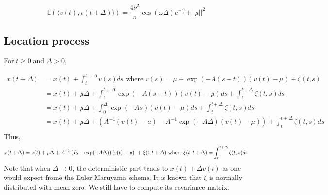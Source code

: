 \documentclass[11pt]{article}
\newcommand {\1}{\mathbb{1}}
\begin{document}
\begin{equation}
	\mathbb{E}(\langle v(t), v(t+\Delta) \rangle )=\frac{4\nu^2}{\pi} \cos(\omega \Delta) e^{-\frac{\Delta}{\tau}}+\vert \vert \mu \vert \vert^2
	\label{eq: RACVM autocovariance function}
\end{equation}

\subsection{Location process} \label{RACVM location process}
For $t \geq 0$ and $\Delta >0$,

\begin{align*}
	x(t+\Delta)&=x(t)+\int_t^{t+\Delta} v(s) ds \mbox{ where } v(s)=\mu+\exp(-A(s-t))(v(t)-\mu)+\zeta(t,s) \\
	&= x(t)+\mu \Delta+\int_t^{t+\Delta} \exp(-A(s-t))(v(t)-\mu) ds +\int_t^{t+\Delta} \zeta(t,s) ds \\
	&= x(t)+\mu \Delta +\int_0^{\Delta} \exp(-As)(v(t)-\mu) ds +\int_t^{t+\Delta} \zeta(t,s) ds \\
	&=x(t)+\mu \Delta + (A^{-1}(v(t)-\mu)-A^{-1}\exp(-A\Delta)(v(t)-\mu))+\int_t^{t+\Delta} \zeta(t,s) ds \\
\end{align*}
Thus, 
\begin{equation}
	x(t+\Delta)=x(t)+\mu \Delta+A^{-1} \left( I_2-\exp(-A\Delta)\right)(v(t)-\mu) +\xi(t,t+\Delta) \\
	\mbox{ where } \xi(t,t+\Delta)=\int_t^{t+\Delta} \zeta(t,s)ds
\end{equation}
Note that when $\Delta \rightarrow 0$, the deterministic part tends to $x(t)+\Delta v(t)$ as one would expect frome the Euler Maruyama scheme.
It is known that $\xi$ is normally distributed with mean zero. We still have to compute its covariance matrix.
\end{document}
